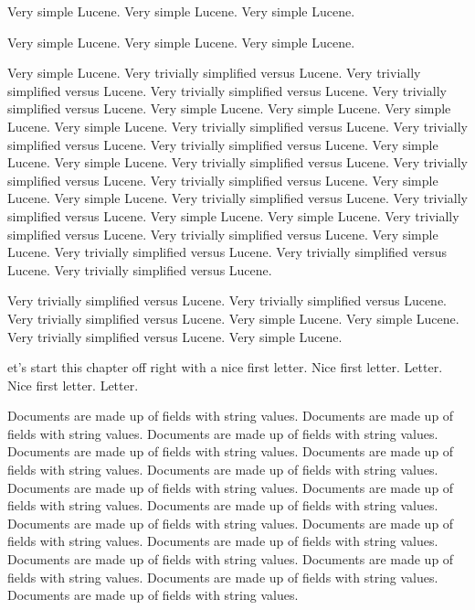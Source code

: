 Very simple Lucene.
Very simple Lucene.
Very simple Lucene.


Very simple Lucene.
Very simple Lucene.
Very simple Lucene.

Very simple Lucene.
Very trivially simplified versus  Lucene.
Very trivially simplified versus  Lucene.
Very trivially simplified versus  Lucene.
Very trivially simplified versus  Lucene.
Very simple Lucene.
Very simple Lucene.
Very simple Lucene.
Very simple Lucene.
Very trivially simplified versus  Lucene.
Very trivially simplified versus  Lucene.
Very trivially simplified versus  Lucene.
Very simple Lucene.
Very simple Lucene.
Very trivially simplified versus  Lucene.
Very trivially simplified versus  Lucene.
Very trivially simplified versus  Lucene.
Very simple Lucene.
Very simple Lucene.
Very trivially simplified versus  Lucene.
Very trivially simplified versus  Lucene.
Very simple Lucene.
Very simple Lucene.
Very trivially simplified versus  Lucene.
Very trivially simplified versus  Lucene.
Very simple Lucene.
Very trivially simplified versus  Lucene.
Very trivially simplified versus  Lucene.
Very trivially simplified versus  Lucene.


Very trivially simplified versus  Lucene.
Very trivially simplified versus  Lucene.
Very trivially simplified versus  Lucene.
Very simple Lucene.
Very simple Lucene.
Very trivially simplified versus  Lucene.
Very simple Lucene.


et's start this chapter off right with a nice
first letter.  Nice first letter. Letter.
Nice first letter. Letter.


\noindent
Documents are made up of fields with string values.
Documents are made up of fields with string values.
Documents are made up of fields with string values.
Documents are made up of fields with string values.
Documents are made up of fields with string values.
Documents are made up of fields with string values.
Documents are made up of fields with string values.
Documents are made up of fields with string values.
Documents are made up of fields with string values.
Documents are made up of fields with string values.
Documents are made up of fields with string values.
Documents are made up of fields with string values.
Documents are made up of fields with string values.
Documents are made up of fields with string values.
Documents are made up of fields with string values.
Documents are made up of fields with string values.

